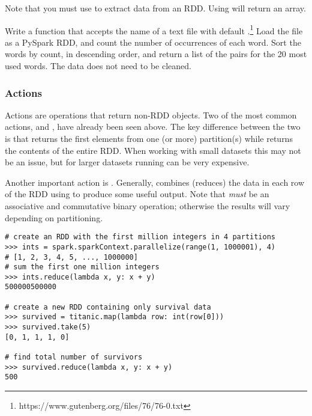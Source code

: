\begin{warn}
Note that you must use  to extract data from an RDD. Using  will return an array.
\end{warn}

\begin{problem}
Write a function that accepts the name of a text file with default .\footnote{https://www.gutenberg.org/files/76/76-0.txt}
Load the file as a PySpark RDD, and count the number of occurrences of each word.
Sort the words by count, in descending order, and return a list of the  pairs for the 20 most used words. The data does not need to be cleaned.
\label{prob:spark-rdd-hello-world}
\end{problem}

\subsubsection*{Actions}
Actions are operations that return non-RDD objects.
Two of the most common actions,  and , have already been seen above.
The key difference between the two is that  returns the first  elements from one (or more) partition(s) while  returns the contents of the entire RDD.
When working with small datasets this may not be an issue, but for larger datasets running  can be very expensive.

Another important action is . Generally,  combines (reduces) the data in each row of the RDD using  to produce some useful output. 
Note that  \textit{must} be an associative and commutative binary operation; otherwise the results will vary depending on partitioning.

\begin{lstlisting}
# create an RDD with the first million integers in 4 partitions
>>> ints = spark.sparkContext.parallelize(range(1, 1000001), 4)
# [1, 2, 3, 4, 5, ..., 1000000]
# sum the first one million integers
>>> ints.reduce(lambda x, y: x + y)
500000500000

# create a new RDD containing only survival data
>>> survived = titanic.map(lambda row: int(row[0]))
>>> survived.take(5)
[0, 1, 1, 1, 0]

# find total number of survivors
>>> survived.reduce(lambda x, y: x + y)
500
\end{lstlisting}

